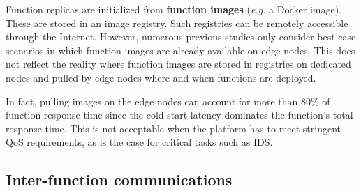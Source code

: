 Function replicas are initialized from \textbf{function images} (\textit{e.g.} a Docker image). These are stored in an image registry. Such registries can be remotely accessible through the Internet. %
However, numerous previous studies \cite{bhasiCypressInputSizesensitive2022, zijunFassflowEfficient2022, smithFaDOFaaSFunctions2022, zhangFIRSTExploitingMultiDimensional2023} only consider best-case scenarios in which function images are already available on edge nodes. This does not reflect the reality where function images are stored in registries on dedicated nodes and pulled by edge nodes where and when functions are deployed. %

In fact, pulling images on the edge nodes can account for more than 80\% of function response time \cite{yanHermesEfficientCache2020} since the cold start latency dominates the function's total response time. This is not acceptable when the platform has to meet stringent QoS requirements, as is the case for critical tasks such as IDS.



\subsection{Inter-function communications}
\label{section:herocache-background-communications}

